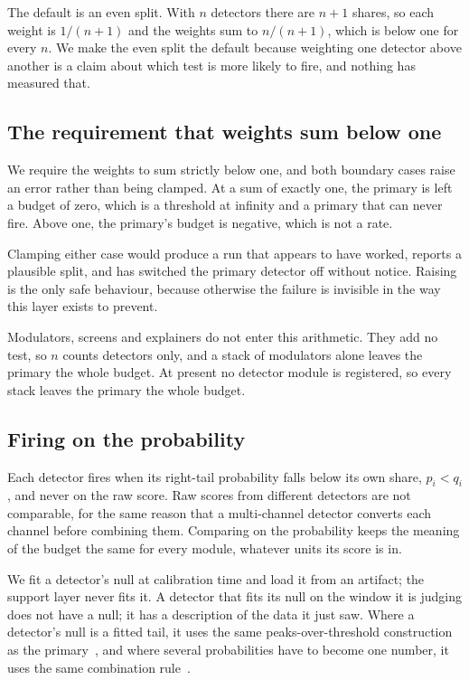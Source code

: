 \documentclass{article}
\begin{document}
The default is an even split. With $n$ detectors there are $n+1$ shares, so
each weight is $1/(n+1)$ and the weights sum to $n/(n+1)$, which is below one
for every $n$. We make the even split the default because weighting one
detector above another is a claim about which test is more likely to fire, and
nothing has measured that.

\subsection{The requirement that weights sum below one}

We require the weights to sum strictly below one, and both boundary cases raise
an error rather than being clamped. At a sum of exactly one, the primary is
left a budget of zero, which is a threshold at infinity and a primary that can
never fire. Above one, the primary's budget is negative, which is not a rate.

Clamping either case would produce a run that appears to have worked, reports a
plausible split, and has switched the primary detector off without notice.
Raising is the only safe behaviour, because otherwise the failure is invisible
in the way this layer exists to prevent.

Modulators, screens and explainers do not enter this arithmetic. They add no
test, so $n$ counts detectors only, and a stack of modulators alone leaves the
primary the whole budget. At present no detector module is registered, so
every stack leaves the primary the whole budget.

\subsection{Firing on the probability}

Each detector fires when its right-tail probability falls below its own share,
$p_{i} < q_{i}$, and never on the raw score. Raw scores from different
detectors are not comparable, for the same reason that a multi-channel detector
converts each channel before combining them. Comparing on the probability keeps
the meaning of the budget the same for every module, whatever units its score
is in.

We fit a detector's null at calibration time and load it from an artifact; the
support layer never fits it. A detector that fits its null on the window it is
judging does not have a null; it has a description of the data it just saw.
Where a detector's null is a fitted tail, it uses the same peaks-over-threshold
construction as the primary~\citep{siffer2017spot,pickands1975gpd}, and where
several probabilities have to become one number, it uses the same combination
rule~\citep{fisher1925methods}.
\end{document}
